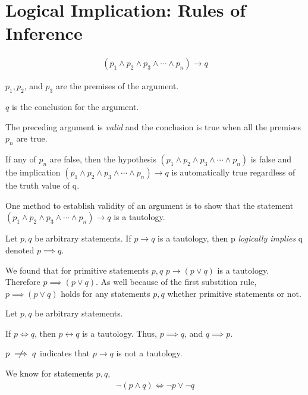 \documentclass[../../../../main.tex]{subfiles}
\begin{document}
\section{Logical Implication: Rules of Inference}
    
\begin{align*}
    (p_1 \land p_2 \land p_3 \land \cdots \land p_n) \to q
\end{align*}

$p_1, p_2$, and $p_3$ are the premises of the argument.

$q$ is the conclusion for the argument.

The preceding argument is \textit{valid} and the conclusion is true when all the premises $p_n$ are true.

If any of $p_n$ are false, then the hypothesis $(p_1 \land p_2 \land p_3 \land \cdots \land p_n)$ is false
and the implication $(p_1 \land p_2 \land p_3 \land \cdots \land p_n) \to q$ is automatically true
regardless of the truth value of q.

One method to establish validity of an argument is to show that 
the statement $(p_1 \land p_2 \land p_3 \land \cdots \land p_n) \to q$ is a tautology.

\begin{definition}
    Let $p,q$ be arbitrary statements. If $p \to q$ is a tautology, then
    p \textit{logically implies} q denoted $p \implies q$.
\end{definition}

We found that for primitive statements $p, q$ $p \to (p \lor q)$ is a tautology.
Therefore $p \implies (p \lor q)$. As well because of the first substition rule,
$p \implies (p \lor q)$ holds for any statements $p, q$ whether primitive statements or not.

Let $p, q$ be arbitrary statements.

If $p \iff q$, then $p \leftrightarrow q$ is a tautology. Thus, $p \implies q$, and $q \implies p$.

$p \centernot\implies q$ indicates that $p \to q$ is not a tautology.

We know for statements $p, q$,
\begin{align*}
    \neg (p \land q) \iff \neg p \lor \neg q
\end{align*}
\end{document}
